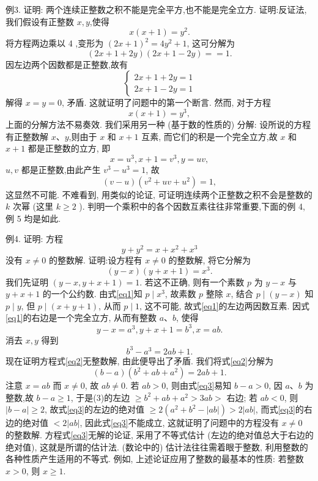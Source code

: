 例3. 证明: 两个连续正整数之积不能是完全平方,也不能是完全立方.
证明:反证法,我们假设有正整数 $x, y$,使得
$$
x(x+1)=y^2 .
$$
将方程两边乘以 4 ,变形为 $(2 x+1)^2=4 y^2+1$, 这可分解为
$$
(2 x+1+2 y)(2 x+1-2 y)==1 .
$$
因左边两个因数都是正整数,故有
$$
\left\{\begin{array}{l}
2 x+1+2 y=1 \\
2 x+1-2 y=1
\end{array}\right.
$$
解得 $x=y=0$, 矛盾.
这就证明了问题中的第一个断言.
然而, 对于方程
$$
x(x+1)=y^3,
$$
上面的分解方法不易奏效.
我们采用另一种 (基于数的性质的) 分解: 设所说的方程有正整数解 $x 、 y$,则由于 $x$ 和 $x+1$ 互素, 而它们的积是一个完全立方,故 $x$ 和 $x+1$ 都是正整数的立方, 即
$$
x=u^3, x+1=v^3, y=u v,
$$
$u, v$ 都是正整数,由此产生 $v^3-u^3=1$, 故
$$
(v-u)\left(v^2+u v+u^2\right)=1,
$$
这显然不可能.
不难看到, 用类似的论证, 可证明连续两个正整数之积不会是整数的 $k$ 次幂 (这里 $k \geqslant 2$ ).
判明一个乘积中的各个因数互素往往非常重要,下面的例 4, 例 5 均是如此.



例4. 证明: 方程
$$
y+y^2=x+x^2+x^3
$$
没有 $x \neq 0$ 的整数解.
证明:设方程有 $x \neq 0$ 的整数解, 将它分解为
$$
(y-x)(y+x+1)=x^3 . \label{eq1}
$$
我们先证明 $(y-x, y+x+1)=1$. 若这不正确, 则有一个素数 $p$ 为 $y- x$ 与 $y+x+1$ 的一个公约数.
由式\ref{eq1}知 $p \mid x^3$, 故素数 $p$ 整除 $x$, 结合 $p \mid(y-x)$ 知 $p \mid y$, 但 $p \mid(x+y+1)$, 从而 $p \mid 1$, 这不可能, 故式\ref{eq1}的左边两因数互素.
因式\ref{eq1}的右边是一个完全立方, 从而有整数 $a 、 b$, 使得
$$
y-x=a^3, y+x+1=b^3, x=a b .
$$
消去 $x, y$ 得到
$$
b^3-a^3=2 a b+1 . \label{eq2}
$$
现在证明方程式\ref{eq2}无整数解, 由此便导出了矛盾.
我们将式\ref{eq2}分解为
$$
(b-a)\left(b^2+a b+a^2\right)=2 a b+1 . \label{eq3}
$$
注意 $x=a b$ 而 $x \neq 0$, 故 $a b \neq 0$. 若 $a b>0$, 则由式\ref{eq3}易知 $b-a>0$, 因 $a 、 b$ 为整数,故 $b-a \geqslant 1$, 于是(3)的左边 $\geqslant b^2+a b+a^2>3 a b>$ 右边; 若 $a b<0$, 则 $|b-a| \geqslant 2$, 故式\ref{eq3}的左边的绝对值 $\geqslant 2\left(a^2+b^2-|a b|\right)>2|a b|$, 而式\ref{eq3}的右边的绝对值 $<2|a b|$, 因此式\ref{eq3}不能成立, 这就证明了问题中的方程没有 $x \neq 0$ 的整数解.
方程式\ref{eq3}无解的论证, 采用了不等式估计 (左边的绝对值总大于右边的绝对值), 这就是所谓的估计法.
(数论中的) 估计法往往需着眼于整数, 利用整数的各种性质产生适用的不等式.
例如, 上述论证应用了整数的最基本的性质: 若整数 $x>0$, 则 $x \geqslant 1$.



